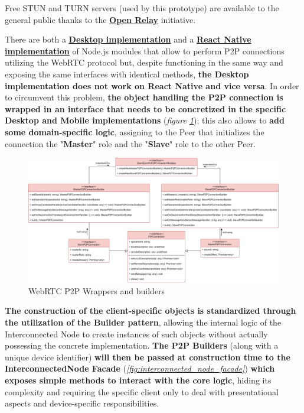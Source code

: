 Free STUN and TURN servers (used by this prototype) are available to the general public thanks to the \textbf{\href{https://www.metered.ca/tools/openrelay/}{Open Relay}} initiative.

There are both a \textbf{\href{https://www.npmjs.com/package/wrtc}{Desktop implementation}} and a \textbf{\href{https://www.npmjs.com/package/react-native-webrtc}{React Native implementation}} of Node.js modules that allow to perform P2P connections utilizing the WebRTC protocol but, despite functioning in the same way and exposing the same interfaces with identical methods, \textbf{the Desktop implementation does not work on React Native and vice versa}. In order to circumvent this problem, \textbf{the object handling the P2P connection is wrapped in an interface that needs to be concretized in the specific Desktop and Mobile implementations} (\textit{figure \ref{fig:p2p_wrapper}}); this also allows to \textbf{add some domain-specific logic}, assigning to the Peer that initializes the connection the "\textbf{Master}" role and the "\textbf{Slave}" role to the other Peer. 

\begin{figure}[!ht]
    \centering
    \includegraphics[width=\linewidth]{document/chapters/chapter_6/images/p2p_wrapper.png}
    \caption{WebRTC P2P Wrappers and builders}
    \label{fig:p2p_wrapper}
\end{figure}

\textbf{The construction of the client-specific objects is standardized through the utilization of the Builder pattern}, allowing the internal logic of the Interconnected Node to create instances of such objects without actually possessing the concrete implementation. \textbf{The P2P Builders} (along with a unique device identifier) \textbf{will then be passed at construction time to the InterconnectedNode Facade} (\textit{\ref{fig:interconnected_node_facade}}) \textbf{which exposes simple methods to interact with the core logic}, hiding its complexity and requiring the specific client only to deal with presentational aspects and device-specific responsibilities.

